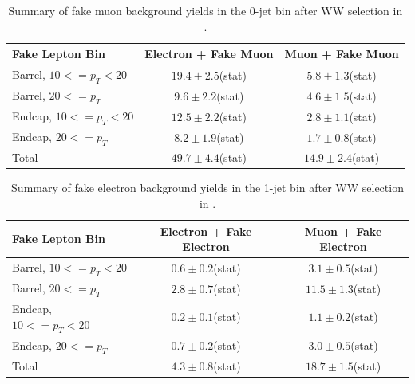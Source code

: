 \begin{table}[!htbp]
\begin{center}
\begin{tabular}{|l|c|c|}
\hline
Fake Lepton Bin               & Electron + Fake Muon & Muon + Fake Muon  \\
\hline
Barrel, $10 <= p_{T} < 20$    &  $19.4 \pm  2.5$(stat)     &   $5.8 \pm  1.3$(stat) \\
Barrel, $20 <= p_{T} $        &  $ 9.6 \pm  2.2$(stat)     &   $4.6 \pm  1.5$(stat) \\
Endcap, $10 <= p_{T} < 20$    &  $12.5 \pm  2.2$(stat)     &   $2.8 \pm  1.1$(stat) \\
Endcap, $20 <= p_{T} $        &  $ 8.2 \pm  1.9$(stat)     &   $1.7 \pm  0.8$(stat) \\
\hline
Total                         &  $49.7 \pm  4.4 $(stat)     &   $14.9 \pm  2.4$(stat) \\
\hline
\end{tabular}
\caption{Summary of fake muon background yields in the 0-jet bin after WW selection in \intlumi.}
\label{tab:FakeMuonBkgPrediction_WWSelection_0JetBin}
\end{center}
\end{table}

\begin{table}[!htbp]
\begin{center}
\begin{tabular}{|l|c|c|}
\hline
Fake Lepton Bin               & Electron + Fake Electron & Muon + Fake Electron  \\
\hline
Barrel, $10 <= p_{T} < 20$    &  $0.6 \pm  0.2$(stat)	  &   $ 3.1 \pm  0.5$(stat) \\
Barrel, $20 <= p_{T} $        &  $2.8 \pm  0.7$(stat)	  &   $11.5 \pm  1.3$(stat) \\
Endcap, $10 <= p_{T} < 20$    &  $0.2 \pm  0.1$(stat)	  &   $ 1.1 \pm  0.2$(stat) \\
Endcap, $20 <= p_{T} $        &  $0.7 \pm  0.2$(stat)	  &   $ 3.0 \pm  0.5$(stat) \\
\hline
Total                         &  $4.3 \pm  0.8$(stat)      &   $18.7 \pm  1.5$(stat) \\
\hline
\end{tabular}
\caption{Summary of fake electron background yields in the 1-jet bin after WW selection in \intlumi.}
\label{tab:FakeElectronBkgPrediction_WWSelection_1JetBin}
\end{center}
\end{table}

